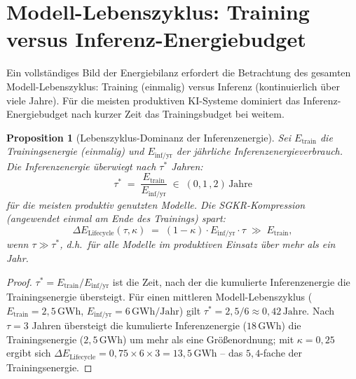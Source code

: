 \documentclass[12pt, a4paper, openany]{report}
\newtheorem{proposition}[theorem]{Proposition}
\begin{document}
\section{Modell-Lebenszyklus: Training versus Inferenz-Energiebudget}
\label{sec:lifecycle}

Ein vollständiges Bild der Energiebilanz erfordert die Betrachtung des
gesamten Modell-Lebenszyklus: Training (einmalig) versus Inferenz
(kontinuierlich über viele Jahre).  Für die meisten produktiven KI-Systeme
dominiert das Inferenz-Energiebudget nach kurzer Zeit das Trainingsbudget
bei weitem.

\begin{proposition}[Lebenszyklus-Dominanz der Inferenzenergie]
\label{prop:lifecycle}
Sei $E_{\mathrm{train}}$ die Trainingsenergie (einmalig) und
$E_{\mathrm{inf/yr}}$ der jährliche Inferenzenergieverbrauch.
Die Inferenzenergie überwiegt nach $\tau^*$ Jahren:
\begin{equation}
  \label{eq:lifecycle}
  \tau^*
  \;=\;
  \frac{E_{\mathrm{train}}}{E_{\mathrm{inf/yr}}}
  \;\in\; (0{,}1\,, 2)\,\mathrm{Jahre}
\end{equation}
für die meisten produktiv genutzten Modelle.  Die SGKR-Kompression
(angewendet einmal am Ende des Trainings) spart:
\begin{equation}
  \label{eq:lifecycle_savings}
  \Delta E_{\mathrm{Lifecycle}}(\tau, \kappa)
  \;=\;
  (1-\kappa) \cdot E_{\mathrm{inf/yr}} \cdot \tau
  \;\gg\; E_{\mathrm{train}},
\end{equation}
wenn $\tau \gg \tau^*$, d.h.\ für alle Modelle im produktiven Einsatz
über mehr als ein Jahr.
\end{proposition}

\begin{proof}
$\tau^* = E_{\mathrm{train}} / E_{\mathrm{inf/yr}}$ ist die Zeit, nach der
die kumulierte Inferenzenergie die Trainingsenergie übersteigt.
Für einen mittleren Modell-Lebenszyklus ($E_{\mathrm{train}} = 2{,}5\,\mathrm{GWh}$,
$E_{\mathrm{inf/yr}} = 6\,\mathrm{GWh/Jahr}$) gilt
$\tau^* = 2{,}5/6 \approx 0{,}42\,\mathrm{Jahre}$.  Nach $\tau = 3$ Jahren
übersteigt die kumulierte Inferenzenergie ($18\,\mathrm{GWh}$) die
Trainingsenergie ($2{,}5\,\mathrm{GWh}$) um mehr als eine Größenordnung;
mit $\kappa = 0{,}25$ ergibt sich
$\Delta E_{\mathrm{Lifecycle}} = 0{,}75 \times 6 \times 3 = 13{,}5\,\mathrm{GWh}$
-- das $5{,}4$-fache der Trainingsenergie.
\end{proof}
\end{document}

